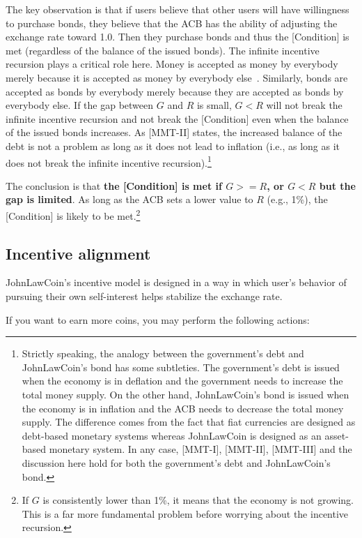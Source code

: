 \documentclass[dvipdfmx,a4paper]{article}
\begin{document}
The key observation is that if users believe that other users will have willingness to purchase bonds, they believe that the ACB has the ability of adjusting the exchange rate toward 1.0. Then they purchase bonds and thus the [Condition] is met (regardless of the balance of the issued bonds). The infinite incentive recursion plays a critical role here. Money is accepted as money by everybody merely because it is accepted as money by everybody else~\cite{iwai1996boostrap,iwai1997evolution}. Similarly, bonds are accepted as bonds by everybody merely because they are accepted as bonds by everybody else. If the gap between $G$ and $R$ is small, $G<R$ will not break the infinite incentive recursion and not break the [Condition] even when the balance of the issued bonds increases. As [MMT-II] states, the increased balance of the debt is not a problem as long as it does not lead to inflation (i.e., as long as it does not break the infinite incentive recursion).\footnote{Strictly speaking, the analogy between the government's debt and JohnLawCoin's bond has some subtleties. The government's debt is issued when the economy is in deflation and the government needs to increase the total money supply. On the other hand, JohnLawCoin's bond is issued when the economy is in inflation and the ACB needs to decrease the total money supply. The difference comes from the fact that fiat currencies are designed as debt-based monetary systems whereas JohnLawCoin is designed as an asset-based monetary system. In any case, [MMT-I], [MMT-II], [MMT-III] and the discussion here hold for both the government's debt and JohnLawCoin's bond.}

The conclusion is that \textbf{the [Condition] is met if $G>=R$, or $G<R$ but the gap is limited}. As long as the ACB sets a lower value to $R$ (e.g., 1\%), the [Condition] is likely to be met.\footnote{If $G$ is consistently lower than 1\%, it means that the economy is not growing. This is a far more fundamental problem before worrying about the incentive recursion.}

\subsection{Incentive alignment}

JohnLawCoin's incentive model is designed in a way in which user's behavior of pursuing their own self-interest helps stabilize the exchange rate.

If you want to earn more coins, you may perform the following actions:
\end{document}

